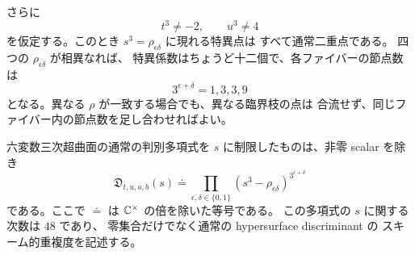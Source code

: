 \begin{theorem}[一般因子での節点数と判別式の重複度]
\label{ifod:thm:generic-nodes}
さらに
\begin{equation}\label{ifod:eq:node-open}
                t^3\ne-2,\qquad u^3\ne4
\end{equation}
を仮定する。このとき $s^3=\rho_{\epsilon\delta}$ に現れる特異点は
すべて通常二重点である。
四つの $\rho_{\epsilon\delta}$ が相異なれば、
特異係数はちょうど十二個で、各ファイバーの節点数は
\[
             3^{\epsilon+\delta}=1,3,3,9
\]
となる。異なる $\rho$ が一致する場合でも、異なる臨界枝の点は
合流せず、同じファイバー内の節点数を足し合わせればよい。

六変数三次超曲面の通常の判別多項式を
$s$ に制限したものは、非零 scalar を除き
\begin{equation}\label{ifod:eq:scheme-disc}
 \boxed{\quad
 \mathfrak D_{t,u,a,b}(s)
   \doteq \prod_{\epsilon,\delta\in\{0,1\}}
            (s^3-\rho_{\epsilon\delta})^{3^{\epsilon+\delta}}
 \quad}
\end{equation}
である。ここで $\doteq$ は $\mathbb C^\times$ の倍を除いた等号である。
この多項式の $s$ に関する次数は $48$ であり、
零集合だけでなく通常の hypersurface discriminant の
スキーム的重複度を記述する。
\end{theorem}

